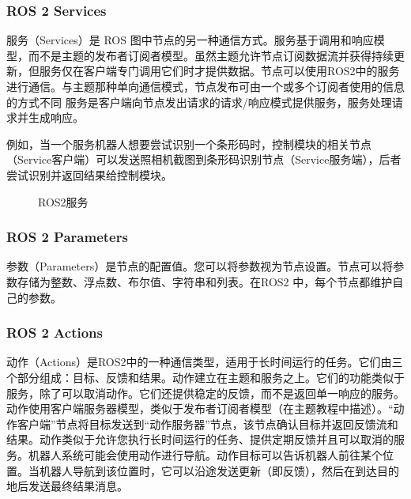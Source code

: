 \documentclass[letterpaper,10pt,english]{sphinxmanual}
\let\sphinxpxdimen\pdfpxdimen\else\newdimen\sphinxpxdimen
\begin{document}
\subsubsection{ROS 2 Services}
\label{\detokenize{chapter_rl_sys/ros:ros-2-services}}
\sphinxAtStartPar
服务（Services）是 ROS
图中节点的另一种通信方式。服务基于调用和响应模型，而不是主题的发布者\sphinxhyphen{}订阅者模型。虽然主题允许节点订阅数据流并获得持续更新，但服务仅在客户端专门调用它们时才提供数据。节点可以使用ROS2中的服务进行通信。与主题那种单向通信模式，节点发布可由一个或多个订阅者使用的信息的方式不同
服务是客户端向节点发出请求的请求/响应模式提供服务，服务处理请求并生成响应。

\sphinxAtStartPar
例如，当一个服务机器人想要尝试识别一个条形码时，控制模块的相关节点（Service客户端）可以发送照相机截图到条形码识别节点（Service服务端），后者尝试识别并返回结果给控制模块。

\begin{figure}[H]
\centering
\capstart

\noindent\sphinxincludegraphics[width=800\sphinxpxdimen]{{ros2_services}.png}
\caption{ROS2服务}\label{\detokenize{chapter_rl_sys/ros:id9}}\label{\detokenize{chapter_rl_sys/ros:ros2-services}}\end{figure}


\subsubsection{ROS 2 Parameters}
\label{\detokenize{chapter_rl_sys/ros:ros-2-parameters}}
\sphinxAtStartPar
参数（Parameters）是节点的配置值。您可以将参数视为节点设置。节点可以将参数存储为整数、浮点数、布尔值、字符串和列表。在ROS2
中，每个节点都维护自己的参数。


\subsubsection{ROS 2 Actions}
\label{\detokenize{chapter_rl_sys/ros:ros-2-actions}}
\sphinxAtStartPar
动作（Actions）是ROS2中的一种通信类型，适用于长时间运行的任务。它们由三个部分组成：目标、反馈和结果。动作建立在主题和服务之上。它们的功能类似于服务，除了可以取消动作。它们还提供稳定的反馈，而不是返回单一响应的服务。动作使用客户端\sphinxhyphen{}服务器模型，类似于发布者\sphinxhyphen{}订阅者模型（在主题教程中描述）。“动作客户端”节点将目标发送到“动作服务器”节点，该节点确认目标并返回反馈流和结果。动作类似于允许您执行长时间运行的任务、提供定期反馈并且可以取消的服务。机器人系统可能会使用动作进行导航。动作目标可以告诉机器人前往某个位置。当机器人导航到该位置时，它可以沿途发送更新（即反馈），然后在到达目的地后发送最终结果消息。
\end{document}
